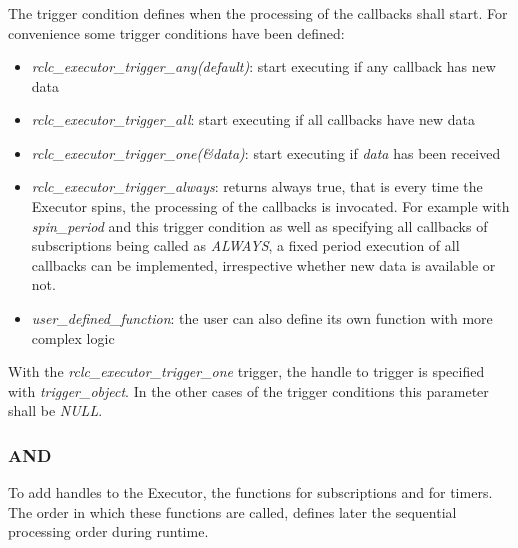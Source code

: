 \subsubsection{}
The trigger condition  defines when the processing of the callbacks shall start. For convenience some trigger conditions have been defined:
\begin{itemize}
    \item \textit{rclc\_executor\_trigger\_any(default)}: start executing if any callback has new data
    \item \textit{rclc\_executor\_trigger\_all}: start executing if all callbacks have new data
    \item \textit{rclc\_executor\_trigger\_one(\&data)}: start executing if \textit{data} has been received
    \item \textit{rclc\_executor\_trigger\_always}: returns always true, that is every time the Executor spins, the processing of the callbacks is invocated. For example with \textit{spin\_period} and this trigger condition as well as specifying all callbacks of subscriptions being called as \textit{ALWAYS}, a fixed period execution of all callbacks can be implemented, irrespective whether new data is available or not.
    \item \textit{user\_defined\_function}: the user can also define its own function with more complex logic
\end{itemize}

With the \textit{rclc\_executor\_trigger\_one} trigger, the handle to trigger is specified with \textit{trigger\_object}. In the other cases of the trigger conditions this parameter shall be \textit{NULL}.

\subsubsection{ AND }
To add handles to the Executor, the functions  for subscriptions and  for timers. The order in which these functions are called, defines later the sequential processing order during runtime.

